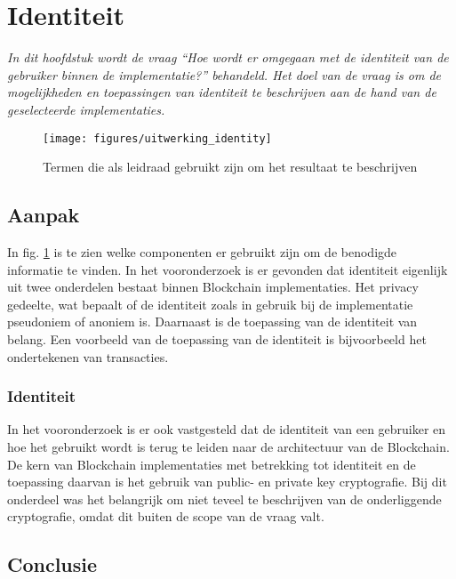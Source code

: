 \section{Identiteit}

\textit{In dit hoofdstuk wordt de vraag ``Hoe wordt er omgegaan met de identiteit van de gebruiker binnen de implementatie?'' behandeld. Het doel van de vraag is om de mogelijkheden en toepassingen van identiteit te beschrijven aan de hand van de geselecteerde implementaties.}

\begin{figure}[h]
  \centering
  \texttt{[image: figures/uitwerking\_identity]}
  \caption[Opbouw beantwoording ``Identiteit'']{Termen die als leidraad gebruikt zijn om het resultaat te beschrijven}
  \label{opbouw:identiteit}
\end{figure}

\subsection{Aanpak}

In fig. \ref{opbouw:identiteit} is te zien welke componenten er gebruikt zijn om de benodigde informatie te vinden. In het vooronderzoek is er gevonden dat identiteit eigenlijk uit twee onderdelen bestaat binnen Blockchain implementaties. Het privacy gedeelte, wat bepaalt of de identiteit zoals in gebruik bij de implementatie pseudoniem of anoniem is. Daarnaast is de toepassing van de identiteit van belang. Een voorbeeld van de toepassing van de identiteit is bijvoorbeeld het ondertekenen van transacties. 

\subsubsection{Identiteit}

In het vooronderzoek is er ook vastgesteld dat de identiteit van een gebruiker en hoe het gebruikt wordt is terug te leiden naar de architectuur van de Blockchain. De kern van Blockchain implementaties met betrekking tot identiteit en de toepassing daarvan is het gebruik van public- en private key cryptografie. Bij dit onderdeel was het belangrijk om niet teveel te beschrijven van de onderliggende cryptografie, omdat dit buiten de scope van de vraag valt. 

\newpage
\subsection{Conclusie}


